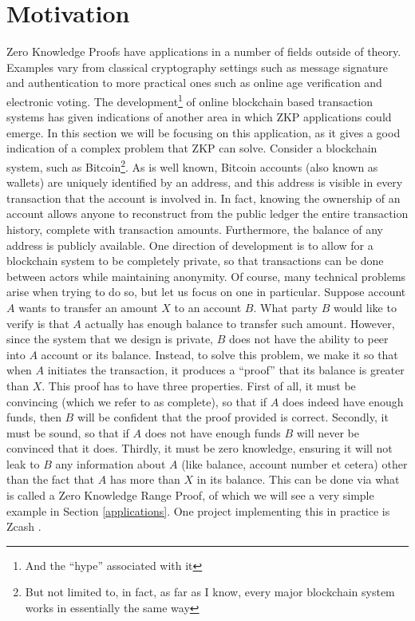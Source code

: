 \documentclass{article}
\begin{document}
\section{Motivation}
\label{motivation}
Zero Knowledge Proofs have applications in a number of fields outside of theory.
Examples vary from classical cryptography settings such as message signature and authentication to more
practical ones such as online age verification and electronic voting. The development\footnote{And the \enquote{hype} associated with it}
of online blockchain based transaction systems has given indications of another area in which ZKP applications could emerge.
In this section we will be focusing on this application, as it gives a good indication of a complex problem that
ZKP can solve. Consider a blockchain system, such as Bitcoin\footnote{But not limited to, in fact, as far as I know, every major blockchain system works in essentially the same way}.
As is well known, Bitcoin accounts (also known as wallets) are uniquely identified
by an address, and this address is visible in every transaction that the account is involved in. In fact, knowing the ownership
of an account allows anyone to reconstruct from the public ledger the entire transaction history, complete with transaction
amounts. Furthermore, the balance of any address is publicly available. One direction of development is to allow
for a blockchain system to be completely private, so that transactions can be done between actors while maintaining
anonymity. Of course, many technical problems arise when trying to do so, but let us focus on one in particular.
Suppose account $A$ wants to transfer an amount $X$ to an account $B$. What party $B$ would like to verify is that
$A$ actually has enough balance to transfer such amount. However, since the system that we design is private, $B$ does
not have the ability to peer into $A$ account or its balance. Instead, to solve this problem, we make it so that
when $A$ initiates the transaction, it produces a \enquote{proof} that its balance is greater than $X$.
This proof has to have three properties. First of all, it must be convincing (which we refer to as complete), so that if $A$ does indeed have
enough funds, then $B$ will be confident that the proof provided is correct. Secondly, it must be
sound, so that if $A$ does not have enough funds $B$ will never be convinced that it does. Thirdly, it must
be zero knowledge, ensuring it will not leak to $B$ any information about $A$ (like balance, account number et cetera) other
than the fact that $A$ has more than $X$ in its balance. This can be done via what is called a Zero Knowledge Range Proof,
of which we will see a very simple example in Section \ref{applications}. One project implementing this in
practice is Zcash \cite{hopwoodZcashProtocolSpecification2016}.
\end{document}
